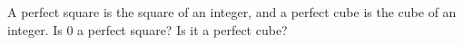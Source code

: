 A perfect square is the square of an integer, and a perfect cube is the cube of an integer. Is $0$ a perfect square? Is it a perfect cube?
